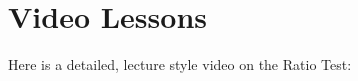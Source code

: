 \documentclass{ximera}
\begin{document}
\section{Video Lessons}

\begin{center}
\begin{foldable}
\end{foldable}
\end{center}


\begin{center}
\begin{unfoldable}
Here is a detailed, lecture style video on the Ratio Test:
\end{unfoldable}
\end{center}
\end{document}
